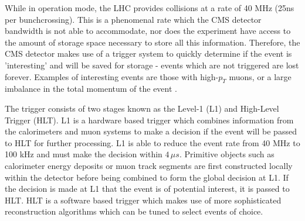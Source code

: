While in operation mode, the LHC provides collisions at a rate of 40 MHz (25ns per bunchcrossing). This is a phenomenal rate which the CMS detector bandwidth is not able to accommodate, nor does the experiment have access to the amount of storage space necessary to store all this information. Therefore, the CMS detector makes use of a trigger system to quickly determine if the event is 'interesting' and will be saved for storage - events which are not triggered are lost forever. Examples of interesting events are those with high-$p_{T}$ muons, or a large imbalance in the total momentum of the event \cite{CMS-TRG-12-001}.

The trigger consists of two stages known as the Level-1 (L1) and High-Level Trigger (HLT). L1 is a hardware based trigger which combines information from the calorimeters and muon systems to make a decision if the event will be passed to HLT for further processing. L1 is able to reduce the event rate from 40 MHz to 100 kHz and must make the decision within $4\,\mu s$. Primitive objects such as calorimeter energy deposits or muon track segments are first constructed locally within the detector before being combined to form the global decision at L1. If the decision is made at L1 that the event is of potential interest, it is passed to HLT. HLT is a software based trigger which makes use of more sophisticated reconstruction algorithms which can be tuned to select events of choice.

